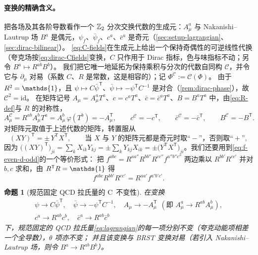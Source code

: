 \documentclass[UTF8,a4paper,11pt,fontset=fandol]{ctexart}
\let\amsmathbb\mathbb
\renewcommand{\mathbb}[1]{\ifx1#1\mathds{1}\else\amsmathbb{#1}\fi}
\theoremstyle{cplain}
\newtheorem{proposition}[theorem]{命题}
\theoremstyle{cdefinition}
\theoremstyle{cremark}
\numberwithin{equation}{section}
\newcommand{\tp}{\mathsf{T}}                         %
\newcommand{\Cop}{\mathcal{C}}                       %
\begin{document}
\paragraph{变换的精确含义。}
把各场及其各阶导数看作一个 $\mathbb Z_2$ 分次交换代数的生成元：$A^a_\mu$ 与 Nakanishi--Lautrup 场 $B^a$ 是偶元，$\psi_f$、$\bar\psi_f$、$c^a$、$\bar c^a$ 是奇元（\cref{sec:setup-lagrangian}、\cref{sec:dirac-bilinear}）。
\cref{eq:C-fields}在生成元上给出一个保持奇偶性的可逆线性代换（夸克场按\cref{eq:dirac-Cfields}变换，$C$ 只作用于 Dirac 指标，色与味指标不动；另令 $B^a\mapsto R^{ab}B^b$）。
我们把它唯一地延拓为保持乘积与分次的代数自同构 $\Cop$，并令它与 $\partial_\mu$ 对易（系数 $C$、$R$ 是常数，这是相容的）；记 $\Phi^{\Cop}:=\Cop(\Phi)$。
由于 $R^2=\mathbb 1$，且 $\psi\mapsto C\bar\psi^{\tp}$、$\bar\psi\mapsto-\psi^{\tp}C^{-1}$ 是对合（\cref{rem:dirac-phase}），故 $\Cop^2=\mathrm{id}$。
在矩阵记号 $A_\mu=A^a_\mu T^a$、$c=c^aT^a$、$\bar c=\bar c^aT^a$、$B=B^aT^a$ 中，由\cref{eq:R-def}与 $R$ 的对称性，
\begin{equation}\label{eq:np-matrix}
A^{\Cop}_\mu=R^{ab}A^b_\mu T^a=A^b_\mu\,\varphi(T^b)=-A_\mu^{\tp},\qquad c^{\Cop}=-c^{\tp},\qquad \bar c^{\Cop}=-\bar c^{\tp},\qquad B^{\Cop}=-B^{\tp}.
\end{equation}
对矩阵元取值于上述代数的矩阵，转置服从
\begin{equation}\label{eq:np-transpose}
(XY)^{\tp}=\pm\,Y^{\tp}X^{\tp},\qquad\text{当 $X$ 与 $Y$ 的矩阵元都是奇元时取“$-$”，否则取“$+$”},
\end{equation}
因为 $\bigl((XY)^{\tp}\bigr)_{ji}=\sum_kX_{ik}Y_{kj}=\pm\sum_kY_{kj}X_{ik}=\pm\bigl(Y^{\tp}X^{\tp}\bigr)_{ji}$。我们还要用到\cref{eq:f-even-d-odd}的一个等价形式：
把 $f^{abc}=R^{aa''}R^{bb''}R^{cc''}f^{a''b''c''}$ 两边乘以 $R^{bb'}R^{cc'}$ 并对 $b,c$ 求和，由 $R^{\tp}R=\mathbb 1$ 得
\begin{equation}\label{eq:np-fRR}
f^{abc}R^{bb'}R^{cc'}=R^{aa'}f^{a'b'c'} .
\end{equation}

\begin{proposition}[规范固定 QCD 拉氏量的 C~不变性]\label{prop:L-invariance}
在变换
\begin{equation}\label{eq:C-fields}
\begin{gathered}
\psi\to C\bar\psi^{\tp},\quad \bar\psi\to-\psi^{\tp}C^{-1},\quad
A_\mu\to-A_\mu^{\tp}\ \ (\text{即 $A^a_\mu\to R^{ab}A^b_\mu$}),\\
c^a\to R^{ab}c^b,\quad \bar c^a\to R^{ab}\bar c^b
\end{gathered}
\end{equation}
下，规范固定的 QCD 拉氏量\cref{eq:lagrangian}的每一项分别不变（夸克动能项相差一个全导数），$\theta$ 项亦不变；
并且该变换与 BRST 变换对易（若引入 Nakanishi--Lautrup 场，则令 $B^a\to R^{ab}B^b$）。
\end{proposition}
\end{document}
